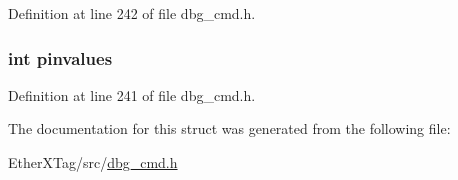 Definition at line 242 of file dbg\-\_\-cmd.\-h.

\hypertarget{structdbg__cmd__type__jtag__pins_aade21146e7e30112816c89d8f2ed8971}{
\subsubsection[{pinvalues}]{\setlength{\rightskip}{0pt plus 5cm}int pinvalues}}\label{structdbg__cmd__type__jtag__pins_aade21146e7e30112816c89d8f2ed8971}


Definition at line 241 of file dbg\-\_\-cmd.\-h.



The documentation for this struct was generated from the following file\-:\begin{DoxyCompactItemize}
\item 
Ether\-X\-Tag/src/\hyperlink{dbg__cmd_8h}{dbg\-\_\-cmd.\-h}\end{DoxyCompactItemize}

